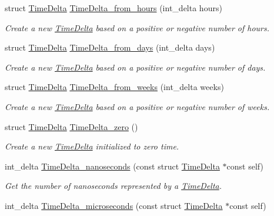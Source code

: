 \begin{DoxyCompactItemize}
struct \hyperlink{structTimeDelta}{\-Time\-Delta} \hyperlink{time-delta_8h_a56f1c443994cd0cbe306cd04e378eabe}{\-Time\-Delta\-\_\-from\-\_\-hours} (int\-\_\-delta hours)
\begin{DoxyCompactList}\small\item\em \-Create a new \hyperlink{structTimeDelta}{\-Time\-Delta} based on a positive or negative number of hours. \end{DoxyCompactList}\item 
struct \hyperlink{structTimeDelta}{\-Time\-Delta} \hyperlink{time-delta_8h_a63cc9a37b13e1ea2c9517a15254761dd}{\-Time\-Delta\-\_\-from\-\_\-days} (int\-\_\-delta days)
\begin{DoxyCompactList}\small\item\em \-Create a new \hyperlink{structTimeDelta}{\-Time\-Delta} based on a positive or negative number of days. \end{DoxyCompactList}\item 
struct \hyperlink{structTimeDelta}{\-Time\-Delta} \hyperlink{time-delta_8h_adeaef2754da892c29f03834c14ad1204}{\-Time\-Delta\-\_\-from\-\_\-weeks} (int\-\_\-delta weeks)
\begin{DoxyCompactList}\small\item\em \-Create a new \hyperlink{structTimeDelta}{\-Time\-Delta} based on a positive or negative number of weeks. \end{DoxyCompactList}\item 
struct \hyperlink{structTimeDelta}{\-Time\-Delta} \hyperlink{time-delta_8h_a4d78cdef19464e2c645923c831f38910}{\-Time\-Delta\-\_\-zero} ()
\begin{DoxyCompactList}\small\item\em \-Create a new \hyperlink{structTimeDelta}{\-Time\-Delta} initialized to zero time. \end{DoxyCompactList}\item 
int\-\_\-delta \hyperlink{time-delta_8h_a6bb384cf10338d51d1e40fdde5d032b8}{\-Time\-Delta\-\_\-nanoseconds} (const struct \hyperlink{structTimeDelta}{\-Time\-Delta} $\ast$const self)
\begin{DoxyCompactList}\small\item\em \-Get the number of nanoseconds represented by a \hyperlink{structTimeDelta}{\-Time\-Delta}. \end{DoxyCompactList}\item 
int\-\_\-delta \hyperlink{time-delta_8h_a64740843f3016de2bddd73ca40dc6465}{\-Time\-Delta\-\_\-microseconds} (const struct \hyperlink{structTimeDelta}{\-Time\-Delta} $\ast$const self)

\end{DoxyCompactItemize}
